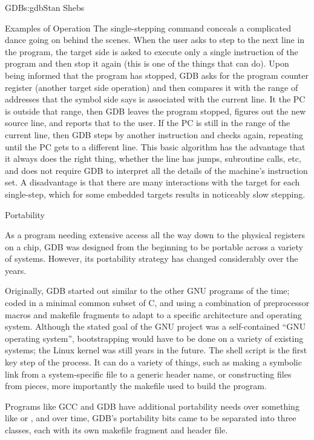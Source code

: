 \begin{aosachapter}{GDB}{s:gdb}{Stan Shebs}
\begin{aosasect1}{Examples of Operation}
The single-stepping command  conceals a complicated dance
going on behind the scenes.  When the user asks to step to the next
line in the program, the target side is asked to execute only a single
instruction of the program and then stop it again (this is one of the
things that  can do).  Upon being informed that the
program has stopped, GDB asks for the program counter register
(another target side operation) and then compares it with the range of
addresses that the symbol side says is associated with the current
line.  It the PC is outside that range, then GDB leaves the program
stopped, figures out the new source line, and reports that to the
user.  If the PC is still in the range of the current line, then GDB
steps by another instruction and checks again, repeating until the PC
gets to a different line.  This basic algorithm has the advantage that
it always does the right thing, whether the line has jumps, subroutine
calls, etc, and does not require GDB to interpret all the details of
the machine's instruction set.  A disadvantage is that there are many
interactions with the target for each single-step, which for some
embedded targets results in noticeably slow stepping.

\end{aosasect1}

\begin{aosasect1}{Portability}

As a program needing extensive access all the way down to the physical
registers on a chip, GDB was designed from the beginning to be
portable across a variety of systems.  However, its portability
strategy has changed considerably over the years.

Originally, GDB started out similar to the other GNU programs of the
time; coded in a minimal common subset of C, and using a combination
of preprocessor macros and makefile fragments to adapt to a specific
architecture and operating system.  Although the stated goal of the
GNU project was a self-contained ``GNU operating system'',
bootstrapping would have to be done on a variety of existing systems;
the Linux kernel was still years in the future.  The 
shell script is the first key step of the process.  It can do a
variety of things, such as making a symbolic link from a
system-specific file to a generic header name, or constructing files
from pieces, more importantly the makefile used to build the program.

Programs like GCC and GDB have additional portability needs over
something like  or , and over time, GDB's
portability bits came to be separated into three classes, each with
its own makefile fragment and header file.


\end{aosasect1}
\end{aosachapter}
